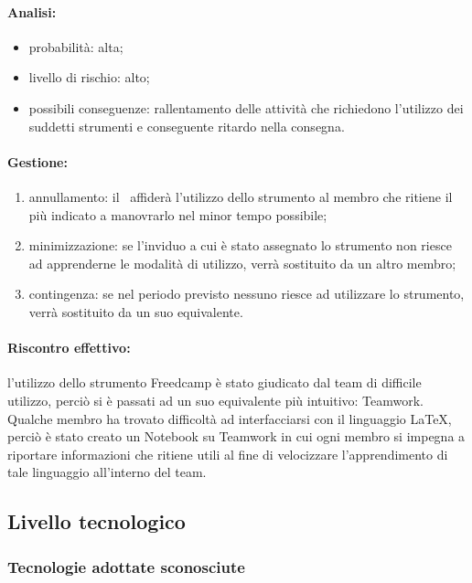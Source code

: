 \documentclass[../PianoProgetto.tex]{subfiles}
\begin{document}
	\paragraph*{Analisi:}
	\begin{itemize}
		\item probabilità: alta;
		\item livello di rischio: alto;
		\item possibili conseguenze: rallentamento delle attività che richiedono l’utilizzo dei suddetti strumenti e conseguente ritardo nella consegna.
	\end{itemize}
	
	\paragraph*{Gestione:}
	\begin{enumerate}
		\item annullamento: il \responsabilediprogetto\ affiderà l'utilizzo dello strumento al membro che ritiene il più indicato a manovrarlo nel minor tempo possibile;
		\item minimizzazione: se l’inviduo a cui è stato assegnato lo strumento non riesce ad apprenderne le modalità di utilizzo, verrà sostituito da un altro membro;
		\item contingenza: se nel periodo previsto nessuno riesce ad utilizzare lo strumento, verrà sostituito da un suo equivalente. 
	\end{enumerate}	
	
	\paragraph*{Riscontro effettivo:} l'utilizzo dello strumento Freedcamp è stato giudicato dal team di difficile utilizzo, perciò si è passati ad un suo equivalente più intuitivo: Teamwork.
	Qualche membro ha trovato difficoltà ad interfacciarsi con il linguaggio \LaTeX , perciò è stato creato un Notebook su Teamwork in cui ogni membro si impegna a riportare informazioni che ritiene utili al fine di velocizzare l'apprendimento di tale linguaggio all'interno del team.

\subsection{Livello tecnologico}

\subsubsection{Tecnologie adottate sconosciute}
\end{document}
